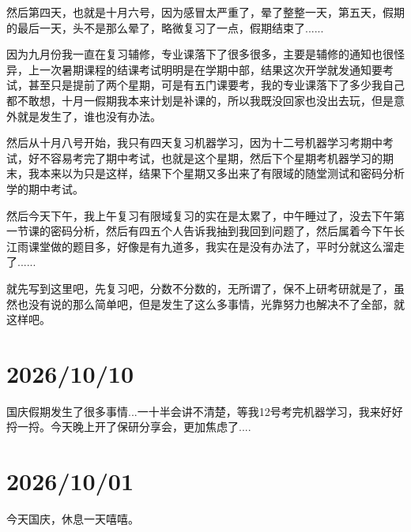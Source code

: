 然后第四天，也就是十月六号，因为感冒太严重了，晕了整整一天，第五天，假期的最后一天，头不是那么晕了，略微复习了一点，假期结束了......

因为九月份我一直在复习辅修，专业课落下了很多很多，主要是辅修的通知也很怪异，上一次暑期课程的结课考试明明是在学期中部，结果这次开学就发通知要考试，甚至只是提前了两个星期，可是有五门课要考，我的专业课落下了多少我自己都不敢想，十月一假期我本来计划是补课的，所以我既没回家也没出去玩，但是意外就是发生了，谁也没有办法。

然后从十月八号开始，我只有四天复习机器学习，因为十二号机器学习考期中考试，好不容易考完了期中考试，也就是这个星期，然后下个星期考机器学习的期末，我本来以为只是这样，结果下个星期又多出来了有限域的随堂测试和密码分析学的期中考试。

然后今天下午，我上午复习有限域复习的实在是太累了，中午睡过了，没去下午第一节课的密码分析，然后有四五个人告诉我抽到我回到问题了，然后属着今下午长江雨课堂做的题目多，好像是有九道多，我实在是没有办法了，平时分就这么溜走了......

就先写到这里吧，先复习吧，分数不分数的，无所谓了，保不上研考研就是了，虽然也没有说的那么简单吧，但是发生了这么多事情，光靠努力也解决不了全部，就这样吧。

\section*{2026/10/10}
国庆假期发生了很多事情...一十半会讲不清楚，等我12号考完机器学习，我来好好捋一捋。今天晚上开了保研分享会，更加焦虑了....

\section*{2026/10/01}

今天国庆，休息一天嘻嘻。
